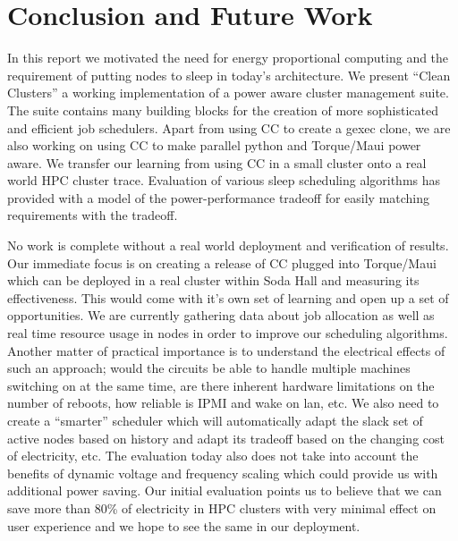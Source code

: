 \section{Conclusion and Future Work} %
\label{sec:conclusion_and_future_work}
In this report we motivated the need for energy proportional computing and the requirement of putting nodes to sleep in today's architecture. We present ``Clean Clusters'' a working implementation of a power aware cluster management suite. The suite contains many building blocks for the creation of more sophisticated and efficient job schedulers. Apart from using CC to create a gexec clone, we are also working on using CC to make parallel python and Torque/Maui power aware. We transfer our learning from using CC in a small cluster onto a real world HPC cluster trace. Evaluation of various sleep scheduling algorithms has provided with a model of the power-performance tradeoff for easily matching requirements with the tradeoff. 

No work is complete without a real world deployment and verification of results. Our immediate focus is on creating a release of CC plugged into Torque/Maui which can be deployed in a real cluster within Soda Hall and measuring its effectiveness. This would come with it's own set of learning and open up a set of opportunities. We are currently gathering data about job allocation as well as real time resource usage in nodes in order to improve our scheduling algorithms. Another matter of practical importance is to understand the electrical effects of such an approach; would the circuits be able to handle multiple machines switching on at the same time, are there inherent hardware limitations on the number of reboots, how reliable is IPMI and wake on lan, etc. We also need to create a ``smarter'' scheduler which will automatically adapt the slack set of active nodes based on history and adapt its tradeoff based on the changing cost of electricity, etc. The evaluation today also does not take into account the benefits of dynamic voltage and frequency scaling which could provide us with additional power saving. Our initial evaluation points us to believe that we can save more than 80\% of electricity in HPC clusters with very minimal effect on user experience and we hope to see the same in our deployment.
